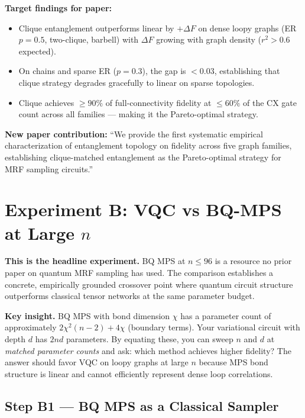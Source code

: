 \documentclass[11pt]{article}
\begin{document}
\begin{notebox}
\textbf{Target findings for paper:}
\begin{itemize}
  \item Clique entanglement outperforms linear by $+\Delta F$ on
        dense loopy graphs (ER $p=0.5$, two-clique, barbell) with
        $\Delta F$ growing with graph density ($r^2 > 0.6$ expected).
  \item On chains and sparse ER ($p=0.3$), the gap is $< 0.03$,
        establishing that clique strategy degrades gracefully to
        linear on sparse topologies.
  \item Clique achieves $\geq 90\%$ of full-connectivity fidelity
        at $\leq 60\%$ of the CX gate count across all families ---
        making it the Pareto-optimal strategy.
\end{itemize}
\textbf{New paper contribution:} ``We provide the first systematic
empirical characterization of entanglement topology on fidelity across
five graph families, establishing clique-matched entanglement as the
Pareto-optimal strategy for MRF sampling circuits.''
\end{notebox}

\section{Experiment B: VQC vs BQ-MPS at Large $n$}

\textbf{This is the headline experiment.} BQ MPS at $n \leq 96$ is
a resource no prior paper on quantum MRF sampling has used. The
comparison establishes a concrete, empirically grounded crossover
point where quantum circuit structure outperforms classical tensor
networks at the same parameter budget.

\textbf{Key insight.} BQ MPS with bond dimension $\chi$ has a
parameter count of approximately $2\chi^2 (n-2) + 4\chi$ (boundary
terms). Your variational circuit with depth $d$ has $2nd$ parameters.
By equating these, you can sweep $n$ and $d$ at \emph{matched
parameter counts} and ask: which method achieves higher fidelity?
The answer should favor VQC on loopy graphs at large $n$ because MPS
bond structure is linear and cannot efficiently represent dense
loop correlations.

\subsection{Step B1 --- BQ MPS as a Classical Sampler}
\end{document}
